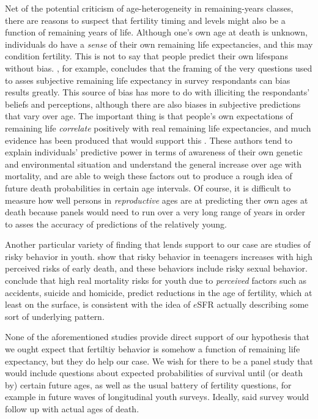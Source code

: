 Net of the potential criticism of age-heterogeneity in remaining-years classes,
there are reasons to suspect that fertility timing and levels might also be
a function of remaining years of life. Although one's own age at death is
unknown, individuals do have a \textit{sense} of their own remaining life
expectancies, and this may condition fertility. This is not to say that people 
predict their own lifespans without bias. \citet{payne2013life}, for example,
concludes that the framing of the very questions used to asses subjective
remaining life expectancy in survey respondants can bias results greatly. This
source of bias has more to do with illiciting the respondants' beliefs and
perceptions, although there are also biases in subjective predictions that vary
over age. The important thing is that people's own expectations of remaining 
life \textit{correlate} positively with real remaining life
expectancies, and much evidence has been produced that would support
this \citep{hurd1995evaluation, mirowsky1999subjective, hurd2002predictive,
perozek2008using, delavande2011differential, post2012longevity}. These authors
tend to explain individuals' predictive power in terms of awareness of
their own genetic and environmental situation and understand the general
increase over age with mortality, and are able to weigh these factors out to
produce a rough idea of future death probabilities in certain age intervals. Of
course, it is difficult to measure how well persons in \textit{reproductive}
ages are at predicting ther own ages at death because panels would need to
run over a very long range of years in order to asses the accuracy of
predictions of the relatively young.

Another particular variety of finding that lends support to our case are studies
of risky behavior in youth. \citet{borowsky2009health} show that risky behavior
in teenagers increases with high perceived risks of early death, and these
behaviors include risky sexual behavior. \citet{wilson1997life} conclude that
high real mortality risks for youth due to \textit{perceived} factors such as 
accidents, suicide and homicide, predict reductions in the age of fertility, which at
least on the surface, is consistent with the idea of $e$SFR actually describing 
some sort of underlying pattern. 

None of the aforementioned studies provide
direct support of our hypothesis that we ought expect that fertiltiy behavior is
somehow a function of remaining life expectancy, but they do help our case. We
wish for there to be a panel study that would include questions about expected probabilities of
survival until (or death by) certain future ages, as well as the usual battery
of fertility questions, for example in future waves of longitudinal youth surveys.
Ideally, said survey would follow up with actual ages of death. 

